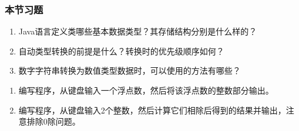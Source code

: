 \begin{frame}
  \frametitle{本节习题}

  \begin{enumerate}
  \item Java语言定义类哪些基本数据类型？其存储结构分别是什么样的？
  \item 自动类型转换的前提是什么？转换时的优先级顺序如何？
  \item 数字字符串转换为数值类型数据时，可以使用的方法有哪些？
  \end{enumerate}

  \begin{enumerate}
  \item 编写程序，从键盘输入一个浮点数，然后将该浮点数的整数部分输出。
  \item 编写程序，从键盘输入2个整数，然后计算它们相除后得到的结果并输出，注意排除0除问题。
  \end{enumerate}
\end{frame}



